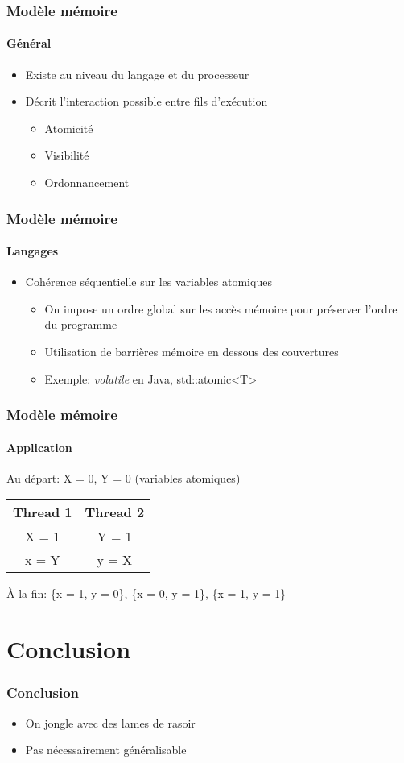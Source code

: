 \documentclass{beamer}
\begin{document}
\begin{frame}
\frametitle{Modèle mémoire}
\framesubtitle{Général}
\begin{itemize}
\item Existe au niveau du langage et du processeur
\item Décrit l'interaction possible entre fils d'exécution
\begin{itemize}
\item Atomicité
\item Visibilité
\item Ordonnancement
\end{itemize}
\end{itemize}
\end{frame}

\begin{frame}
\frametitle{Modèle mémoire}
\framesubtitle{Langages}
\begin{itemize}
\item Cohérence séquentielle sur les variables atomiques
\begin{itemize}
\item On impose un ordre global sur les accès mémoire pour préserver l'ordre du programme
\item Utilisation de barrières mémoire en dessous des couvertures
\item Exemple: \textit{volatile} en Java, std::atomic\textless T\textgreater
\end{itemize}
\end{itemize}
\end{frame}

\begin{frame}
\frametitle{Modèle mémoire}
\framesubtitle{Application}
Au départ: X = 0, Y = 0 (variables atomiques)

\begin{center}
\begin{tabular}{  c | c  }
  \hline
  Thread 1 & Thread 2 \\
  \hline
  X = 1 & Y = 1  \\

  x = Y & y = X \\
  \hline
\end{tabular}
\end{center}

À la fin: \{x = 1, y = 0\}, \{x = 0, y = 1\}, \{x = 1, y = 1\}

\end{frame}

\section{Conclusion}
\begin{frame}
\frametitle{Conclusion}
\begin{itemize}
\item On jongle avec des lames de rasoir
\item<2-> Pas nécessairement généralisable
\end{itemize}
\end{frame}
\end{document}
